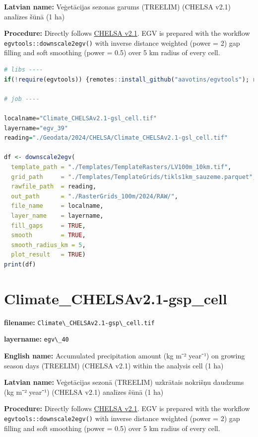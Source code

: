 \documentclass[
]{book}
\newcommand{\passthrough}[1]{#1}
\begin{document}
\textbf{Latvian name:} Veģetācijas sezonas garums (TREELIM) (CHELSA v2.1) analīzes šūnā (1 ha)

\textbf{Procedure:} Directly follows \hyperref[Ch04.11]{CHELSA v2.1}. EGV is prepared with the
workflow \passthrough{\lstinline!egvtools::downscale2egv()!} with inverse distance weighted (power = 2)
gap filling and soft smoothing (power = 0.5) over 5 km radius of every cell.

\begin{lstlisting}[language=R]
# libs ----
if(!require(egvtools)) {remotes::install_github("aavotins/egvtools"); require(egvtools)}

# job ----

localname="Climate_CHELSAv2.1-gsl_cell.tif"
layername="egv_39"
reading="./Geodata/2024/CHELSA/Climate_CHELSAv2.1-gsl_cell.tif"

df <- downscale2egv(
  template_path = "./Templates/TemplateRasters/LV100m_10km.tif",
  grid_path     = "./Templates/TemplateGrids/tikls1km_sauzeme.parquet",
  rawfile_path  = reading,
  out_path      = "./RasterGrids_100m/2024/RAW/",
  file_name     = localname,
  layer_name    = layername,
  fill_gaps     = TRUE,
  smooth        = TRUE,
  smooth_radius_km = 5,
  plot_result   = TRUE)
print(df)
\end{lstlisting}

\section{Climate\_CHELSAv2.1-gsp\_cell}\label{ch06.040}

\textbf{filename:} \passthrough{\lstinline!Climate\_CHELSAv2.1-gsp\_cell.tif!}

\textbf{layername:} \passthrough{\lstinline!egv\_40!}

\textbf{English name:} Accumulated precipitation amount (kg m⁻² year⁻¹) on growing season days (TREELIM) (CHELSA v2.1) within the analysis cell (1 ha)

\textbf{Latvian name:} Veģetācijas sezonā (TREELIM) uzkrātais nokrišņu daudzums (kg m⁻² year⁻¹) (CHELSA v2.1) analīzes šūnā (1 ha)

\textbf{Procedure:} Directly follows \hyperref[Ch04.11]{CHELSA v2.1}. EGV is prepared with the
workflow \passthrough{\lstinline!egvtools::downscale2egv()!} with inverse distance weighted (power = 2)
gap filling and soft smoothing (power = 0.5) over 5 km radius of every cell.
\end{document}
